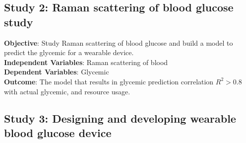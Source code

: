 


\subsection{Study 2: Raman scattering of blood glucose study}\label{intro-s2}

\textbf{Objective}: Study Raman scattering of blood glucose and build a model to predict the glycemic for a wearable device.\\
\textbf{Independent Variables}: Raman scattering of blood\\
\textbf{Dependent Variables}: Glycemic\\
\textbf{Outcome}: The model that results in glycemic prediction correlation $R^2 > 0.8$ with actual glycemic, and resource usage.




\subsection{Study 3: Designing and developing wearable blood glucose device}


